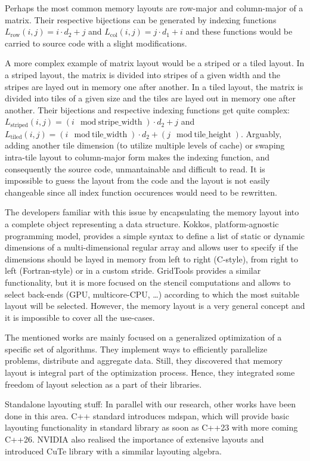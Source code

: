 Perhaps the most common memory layouts are row-major and column-major of a matrix. Their respective bijections can be generated by indexing functions $L_{\text{row}}(i,j) = i \cdot d_2 + j$ and $L_{\text{col}}(i,j) = j \cdot d_1 + i$ and these functions would be carried to source code with a slight modifications. 

A more complex example of matrix layout would be a striped or a tiled layout. In a striped layout, the matrix is divided into stripes of a given width and the stripes are layed out in memory one after another. In a tiled layout, the matrix is divided into tiles of a given size and the tiles are layed out in memory one after another. Their bijections and respective indexing functions get quite complex: $L_{\text{striped}}(i,j) = (i \mod \text{stripe\_width}) \cdot d_2 + j$ and $L_{\text{tiled}}(i,j) = (i \mod \text{tile\_width}) \cdot d_2 + (j \mod \text{tile\_height})$. Arguably, adding another tile dimension (to utilize multiple levels of cache) or swaping intra-tile layout to column-major form makes the indexing function, and consequently the source code, unmantainable and difficult to read. It is impossible to guess the layout from the code and the layout is not easily changeable since all index function occurences would need to be rewritten.

The developers familiar with this issue by encapsulating the memory layout into a complete object representing a data structure. Kokkos, platform-agnostic programming model, provides a simple syntax to define a list of static or dynamic dimensions of a multi-dimensional regular array and allows user to specify if the dimensions should be layed in memory from left to right (C-style), from right to left (Fortran-style) or in a custom stride.
GridTools provides a similar functionality, but it is more focused on the stencil computations and allows to select back-ends (GPU, multicore-CPU, \dots) according to which the most suitable layout will be selected. However, the memory layout is a very general concept and it is impossible to cover all the use-cases.

The mentioned works are mainly focused on a generalized optimization of a specific set of algorithms. They implement ways to efficiently parallelize problems, distribute and aggregate data. Still, they discovered that memory layout is integral part of the optimization process. Hence, they integrated some freedom of layout selection as a part of their libraries.

Standalone layouting stuff:
In parallel with our research, other works have been done in this area. C++ standard introduces mdspan, which will provide basic layouting functionality in standard library as soon as C++23 with more coming C++26. NVIDIA also realised the importance of extensive layouts and introduced CuTe library with a simmilar layouting algebra.

